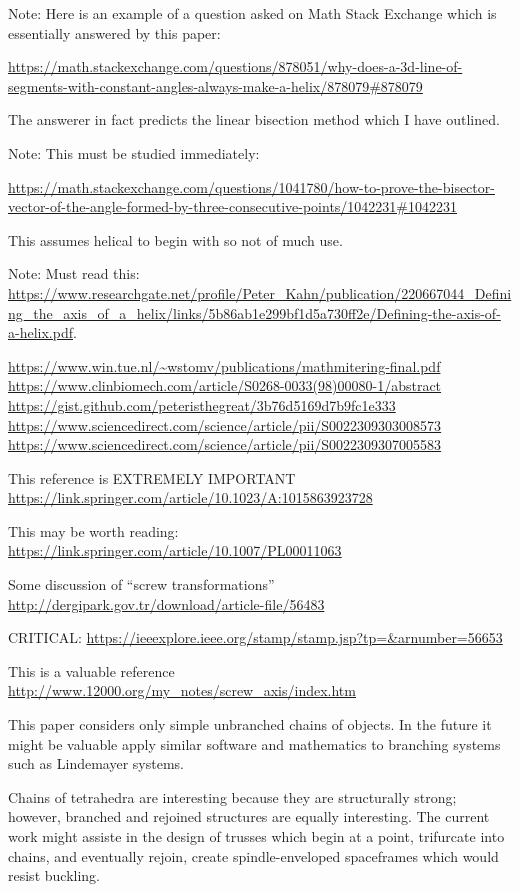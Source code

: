 \documentclass[11pt]{article}
\begin{document}
{Note: Here is an example of a question asked on Math Stack Exchange which is essentially answered by this paper:

\url{https://math.stackexchange.com/questions/878051/why-does-a-3d-line-of-segments-with-constant-angles-always-make-a-helix/878079#878079}

The answerer in fact predicts the linear bisection method which I have outlined.


Note: This must be studied immediately:

\url{https://math.stackexchange.com/questions/1041780/how-to-prove-the-bisector-vector-of-the-angle-formed-by-three-consecutive-points/1042231#1042231}

This assumes helical to begin with so not of much use.

Note: Must read this: \url{https://www.researchgate.net/profile/Peter_Kahn/publication/220667044_Defining_the_axis_of_a_helix/links/5b86ab1e299bf1d5a730ff2e/Defining-the-axis-of-a-helix.pdf}\cite{kahn1989defining}.



\url{https://www.win.tue.nl/~wstomv/publications/mathmitering-final.pdf}
\url{https://www.clinbiomech.com/article/S0268-0033(98)00080-1/abstract}
\url{https://gist.github.com/peteristhegreat/3b76d5169d7b9fc1e333}
\url{https://www.sciencedirect.com/science/article/pii/S0022309303008573}
\url{https://www.sciencedirect.com/science/article/pii/S0022309307005583}

This reference is EXTREMELY IMPORTANT
\url{https://link.springer.com/article/10.1023/A:1015863923728}



This may be worth reading:
\url{https://link.springer.com/article/10.1007/PL00011063}


Some discussion of ``screw transformations''
\url{http://dergipark.gov.tr/download/article-file/56483}

CRITICAL:
\url{https://ieeexplore.ieee.org/stamp/stamp.jsp?tp=&arnumber=56653}


This is a valuable reference
\url{http://www.12000.org/my_notes/screw_axis/index.htm}

This paper considers only simple unbranched chains of objects. In the
future it might be valuable apply similar software and mathematics to
branching systems such as Lindemayer systems\cite{prusinkiewicz2013lindenmayer}.

Chains of tetrahedra are interesting because they are structurally strong;
however, branched and rejoined structures are equally interesting.
The current work might assiste in the design of trusses which begin at
a point, trifurcate into chains, and eventually rejoin, create spindle-enveloped
spaceframes which would resist buckling.

}
\end{document}

